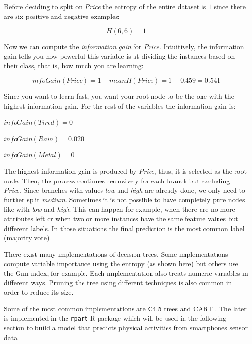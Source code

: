 \documentclass[
  11pt,
]{krantz}
\begin{document}
Before deciding to split on \emph{Price} the entropy of the entire dataset is \(1\) since there are six positive and negative examples:

\begin{equation*}
  H(6,6) = 1
\end{equation*}

Now we can compute the \emph{information gain} for \emph{Price}. Intuitively, the information gain tells you how powerful this variable is at dividing the instances based on their class, that is, how much you are learning:

\begin{equation*}
  infoGain(Price) = 1 - meanH(Price) = 1 - 0.459 = 0.541
\end{equation*}

Since you want to learn fast, you want your root node to be the one with the highest information gain. For the rest of the variables the information gain is:

\(infoGain(Tired) = 0\)

\(infoGain(Rain) = 0.020\)

\(infoGain(Metal) = 0\)

The highest information gain is produced by \emph{Price}, thus, it is selected as the root node. Then, the process continues recursively for each branch but excluding \emph{Price}. Since branches with values \emph{low} and \emph{high} are already done, we only need to further split \emph{medium}. Sometimes it is not possible to have completely pure nodes like with \emph{low} and \emph{high}. This can happen for example, when there are no more attributes left or when two or more instances have the same feature values but different labels. In those situations the final prediction is the most common label (majority vote).

There exist many implementations of decision trees. Some implementations compute variable importance using the entropy (as shown here) but others use the Gini index, for example. Each implementation also treats numeric variables in different ways. Pruning the tree using different techniques is also common in order to reduce its size.

Some of the most common implementations are C4.5 trees \citep{quinlan2014} and CART \citep{steinberg2009}. The later is implemented in the \texttt{rpart} R package \citep{rpart} which will be used in the following section to build a model that predicts physical activities from smartphones sensor data.
\end{document}
